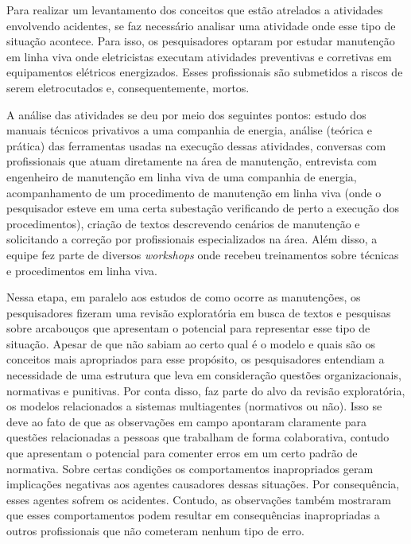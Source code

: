Para realizar um levantamento dos conceitos que estão atrelados a atividades envolvendo acidentes, se faz necessário analisar uma atividade onde esse tipo de situação acontece. Para isso, os pesquisadores optaram por estudar manutenção em linha viva onde eletricistas executam atividades preventivas e corretivas em equipamentos elétricos energizados. Esses profissionais são submetidos a riscos de serem eletrocutados e, consequentemente, mortos. 

A análise das atividades se deu por meio dos seguintes pontos: estudo dos manuais técnicos privativos a uma companhia de energia, análise (teórica e prática) das ferramentas usadas na execução dessas atividades, conversas com profissionais que atuam diretamente na área de manutenção, entrevista com engenheiro de manutenção em linha viva de uma companhia de energia, acompanhamento de um procedimento de manutenção em linha viva (onde o pesquisador esteve em uma certa subestação verificando de perto a execução dos procedimentos), criação de textos descrevendo cenários de manutenção e solicitando a correção por profissionais especializados na área. Além disso, a equipe fez parte de diversos \textit{workshops} onde recebeu treinamentos sobre técnicas e procedimentos em linha viva. 

Nessa etapa, em paralelo aos estudos de como ocorre as manutenções, os pesquisadores fizeram uma revisão exploratória em busca de textos e pesquisas sobre arcabouços que apresentam o potencial para representar esse tipo de situação. Apesar de que não sabiam ao certo qual é o modelo e quais são os conceitos mais apropriados para esse propósito, os pesquisadores entendiam a necessidade de uma estrutura que leva em consideração questões organizacionais, normativas e punitivas. Por conta disso, faz parte do alvo da revisão exploratória, os modelos relacionados a sistemas multiagentes (normativos ou não). Isso se deve ao fato de que as observações em campo apontaram claramente para questões relacionadas a pessoas que trabalham de forma colaborativa, contudo que apresentam o potencial para comenter erros em um certo padrão de normativa. Sobre certas condições os comportamentos inapropriados geram implicações negativas aos agentes causadores dessas situações. Por consequência, esses agentes sofrem os acidentes. Contudo, as observações também mostraram que esses comportamentos podem resultar em consequências inapropriadas a outros profissionais que não cometeram nenhum tipo de erro.